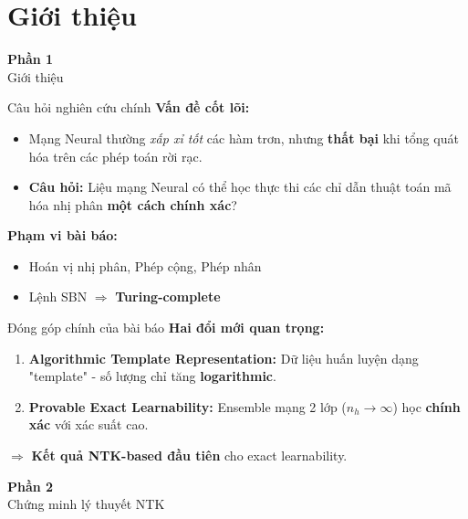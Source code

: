 \section{Giới thiệu}

\begin{frame}{}
  \centering
  \vfill
  {\Huge \textbf{Phần 1}}\\[0.5cm]
  {\Large Giới thiệu}
  \vfill
\end{frame}

\begin{frame}{Câu hỏi nghiên cứu chính}
  \textbf{Vấn đề cốt lõi:}
  \begin{itemize}
    \item Mạng Neural thường \emph{xấp xỉ tốt} các hàm trơn, nhưng \textbf{thất bại} khi tổng quát hóa trên các phép toán rời rạc.
    \item \textbf{Câu hỏi:} Liệu mạng Neural có thể học thực thi các chỉ dẫn thuật toán mã hóa nhị phân \textbf{một cách chính xác}?
  \end{itemize}

  \vspace{0.3cm}
  \textbf{Phạm vi bài báo:}
  \begin{itemize}
    \item Hoán vị nhị phân, Phép cộng, Phép nhân
    \item Lệnh SBN $\Rightarrow$ \textbf{Turing-complete}
  \end{itemize}
\end{frame}

\begin{frame}{Đóng góp chính của bài báo}
  \textbf{Hai đổi mới quan trọng:}
  \begin{enumerate}
    \item \textbf{Algorithmic Template Representation:} Dữ liệu huấn luyện dạng "template" - số lượng chỉ tăng \textbf{logarithmic}.
    \item \textbf{Provable Exact Learnability:} Ensemble mạng 2 lớp ($n_h \to \infty$) học \textbf{chính xác} với xác suất cao.
  \end{enumerate}
  
  \vspace{0.3cm}
  $\Rightarrow$ \textbf{Kết quả NTK-based đầu tiên} cho exact learnability.
\end{frame}

\begin{frame}{}
  \centering
  \vfill
  {\Huge \textbf{Phần 2}}\\[0.5cm]
  {\Large Chứng minh lý thuyết NTK}
  \vfill
\end{frame}
